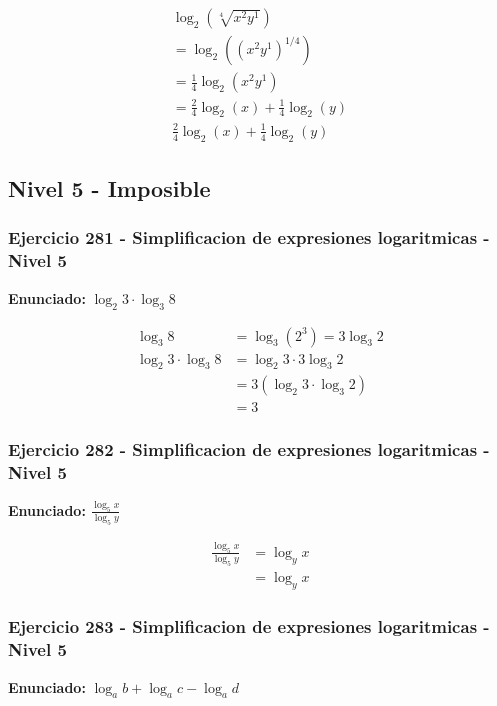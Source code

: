 \documentclass[12pt,a4paper]{article}
\begin{document}
\[
\begin{aligned}
\log_{2}\left(\sqrt[4]{x^{2}y^{1}}\right)\\
=\log_{2}\left((x^{2}y^{1})^{1/4}\right)\\
=\frac{1}{4}\log_{2}\left(x^{2}y^{1}\right) \\
=\frac{2}{4}\log_{2}\left(x\right)+\frac{1}{4}\log_{2}\left(y\right)\\
\boxed{\frac{2}{4}\log_{2}\left(x\right)+\frac{1}{4}\log_{2}\left(y\right)}
\end{aligned}
\]


\newpage

\subsection*{Nivel 5 - Imposible}

\subsubsection*{Ejercicio 281 - Simplificacion de expresiones logaritmicas - Nivel 5}
\textbf{Enunciado:} \(\log_2 3\cdot\log_3 8\)

\[
\begin{aligned}
\log_3 8&=\log_3(2^3)=3\log_3 2\\
\log_2 3\cdot\log_3 8&=\log_2 3\cdot3\log_3 2\\
&=3(\log_2 3\cdot\log_3 2)\\
&=\boxed{3}
\end{aligned}
\]


\subsubsection*{Ejercicio 282 - Simplificacion de expresiones logaritmicas - Nivel 5}
\textbf{Enunciado:} \(\frac{\log_5 x}{\log_5 y}\)

\[
\begin{aligned}
\frac{\log_5 x}{\log_5 y}&=\log_y x\\
&=\boxed{\log_y x}
\end{aligned}
\]


\subsubsection*{Ejercicio 283 - Simplificacion de expresiones logaritmicas - Nivel 5}
\textbf{Enunciado:} \(\log_a b+\log_a c-\log_a d\)
\end{document}
